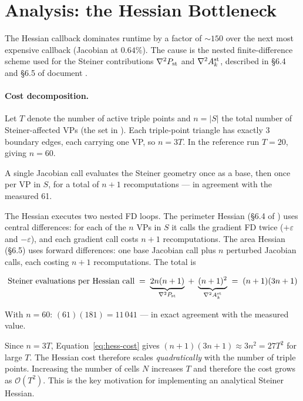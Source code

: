 \documentclass[11pt,a4paper]{article}
\begin{document}
\section{Analysis: the Hessian Bottleneck}
\label{sec:hessian-bottleneck}

The Hessian callback dominates runtime by a factor of $\sim\!150$ over
the next most expensive callback (Jacobian at $0.64\%$).  The cause is
the nested finite-difference scheme used for the Steiner contributions
$\nabla^2 P_{\mathrm{st}}$ and $\nabla^2 A^{\mathrm{st}}_k$, described in \S{}6.4
and \S{}6.5 of document .

\paragraph{Cost decomposition.}
Let $T$ denote the number of active triple points and $n = |S|$ the
total number of Steiner-affected VPs (the set 
in ).  Each triple-point
triangle has exactly 3 boundary edges, each carrying one VP, so
$n = 3T$.  In the reference run $T = 20$, giving $n = 60$.

A single Jacobian call evaluates the Steiner geometry once as a base,
then once per VP in $S$, for a total of $n + 1$ recomputations --- in
agreement with the measured 61.

The Hessian executes two nested FD loops.  The perimeter Hessian
(\S{}6.4 of ) uses central differences:
for each of the $n$ VPs in $S$ it calls the gradient FD twice
($+\varepsilon$ and $-\varepsilon$), and each gradient call costs $n+1$
recomputations.  The area Hessian (\S{}6.5) uses forward differences:
one base Jacobian call plus $n$ perturbed Jacobian calls, each costing
$n+1$ recomputations.  The total is

\begin{equation}
  \text{Steiner evaluations per Hessian call}
  \;=\;
  \underbrace{2n(n+1)}_{\nabla^2 P_{\mathrm{st}}}
  \;+\;
  \underbrace{(n+1)^2}_{\nabla^2 A_k^{\mathrm{st}}}
  \;=\;
  (n+1)(3n+1)
  \label{eq:hess-cost}
\end{equation}

\noindent
With $n = 60$: $(61)(181) = 11\,041$ --- in exact agreement with the
measured value.

\begin{remark}
Since $n = 3T$, Equation~\eqref{eq:hess-cost} gives
$(n+1)(3n+1) \approx 3n^2 = 27T^2$ for large $T$.  The Hessian cost
therefore scales \emph{quadratically} with the number of triple points.
Increasing the number of cells $N$ increases $T$ and therefore the cost
grows as $\mathcal{O}(T^2)$.  This is the key motivation for implementing
an analytical Steiner Hessian.
\end{remark}
\end{document}
